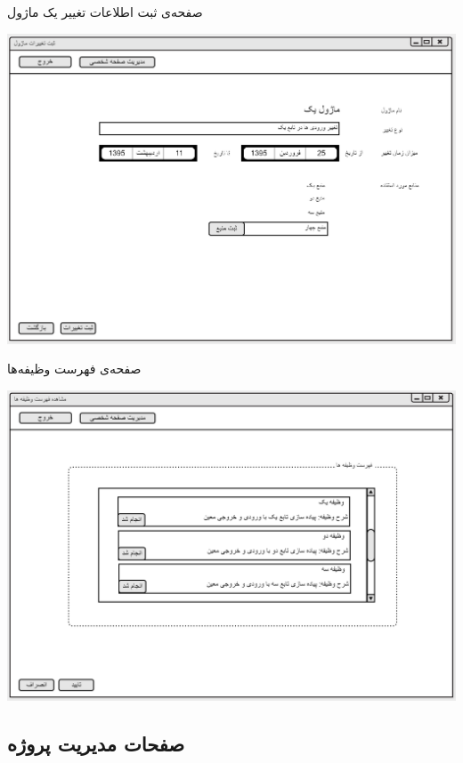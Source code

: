\documentclass{article}
\begin{document}
\vspace{1cm}
صفحه‌ی ثبت اطلاعات تغییر یک ماژول
\begin{center}
\includegraphics[width=\textwidth]{Prototype/Employee/ChangeOneModule.png}
\end{center}

\newpage
\vspace{1cm}
صفحه‌ی فهرست وظیفه‌ها
\begin{center}
\includegraphics[width=\textwidth]{Prototype/Employee/TasksList.png}
\end{center}

\newpage
\subsection{صفحات مدیریت پروژه}
\end{document}
